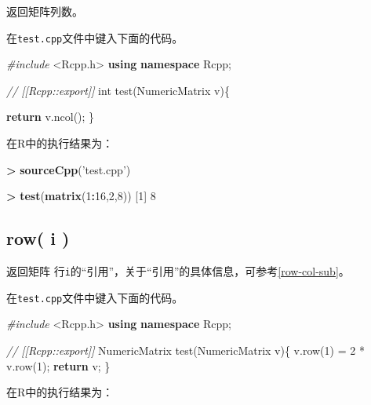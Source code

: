 \documentclass[]{ctexbook}
\newenvironment{Shaded}{\begin{snugshade}}{\end{snugshade}}
\newcommand{\KeywordTok}[1]{\textcolor[rgb]{0.13,0.29,0.53}{\textbf{#1}}}
\newcommand{\DataTypeTok}[1]{\textcolor[rgb]{0.13,0.29,0.53}{#1}}
\newcommand{\DecValTok}[1]{\textcolor[rgb]{0.00,0.00,0.81}{#1}}
\newcommand{\StringTok}[1]{\textcolor[rgb]{0.31,0.60,0.02}{#1}}
\newcommand{\ImportTok}[1]{#1}
\newcommand{\CommentTok}[1]{\textcolor[rgb]{0.56,0.35,0.01}{\textit{#1}}}
\newcommand{\ControlFlowTok}[1]{\textcolor[rgb]{0.13,0.29,0.53}{\textbf{#1}}}
\newcommand{\OperatorTok}[1]{\textcolor[rgb]{0.81,0.36,0.00}{\textbf{#1}}}
\newcommand{\PreprocessorTok}[1]{\textcolor[rgb]{0.56,0.35,0.01}{\textit{#1}}}
\newcommand{\NormalTok}[1]{#1}
\begin{document}
返回矩阵列数。

在\texttt{test.cpp}文件中键入下面的代码。

\begin{Shaded}
\begin{Highlighting}[]
\PreprocessorTok{#include }\ImportTok{<Rcpp.h>}
\KeywordTok{using} \KeywordTok{namespace}\NormalTok{ Rcpp;}

\CommentTok{// [[Rcpp::export]]}
\DataTypeTok{int}\NormalTok{ test(NumericMatrix v)\{}

    \ControlFlowTok{return}\NormalTok{ v.ncol();}
\NormalTok{\}}
\end{Highlighting}
\end{Shaded}

在R中的执行结果为：

\begin{Shaded}
\begin{Highlighting}[]
\OperatorTok{>}\StringTok{ }\KeywordTok{sourceCpp}\NormalTok{(}\StringTok{'test.cpp'}\NormalTok{)}

\OperatorTok{>}\StringTok{ }\KeywordTok{test}\NormalTok{(}\KeywordTok{matrix}\NormalTok{(}\DecValTok{1}\OperatorTok{:}\DecValTok{16}\NormalTok{,}\DecValTok{2}\NormalTok{,}\DecValTok{8}\NormalTok{))}
\NormalTok{[}\DecValTok{1}\NormalTok{] }\DecValTok{8}
\end{Highlighting}
\end{Shaded}

\subsection{row( i )}\label{rowi}

返回矩阵
行\texttt{i}的``引用''，关于``引用''的具体信息，可参考\ref{row-col-sub}。

在\texttt{test.cpp}文件中键入下面的代码。

\begin{Shaded}
\begin{Highlighting}[]
\PreprocessorTok{#include }\ImportTok{<Rcpp.h>}
\KeywordTok{using} \KeywordTok{namespace}\NormalTok{ Rcpp;}

\CommentTok{// [[Rcpp::export]]}
\NormalTok{NumericMatrix test(NumericMatrix v)\{}
\NormalTok{    v.row(}\DecValTok{1}\NormalTok{) = }\DecValTok{2}\NormalTok{ * v.row(}\DecValTok{1}\NormalTok{);}
    \ControlFlowTok{return}\NormalTok{ v;}
\NormalTok{\}}
\end{Highlighting}
\end{Shaded}

在R中的执行结果为：
\end{document}
